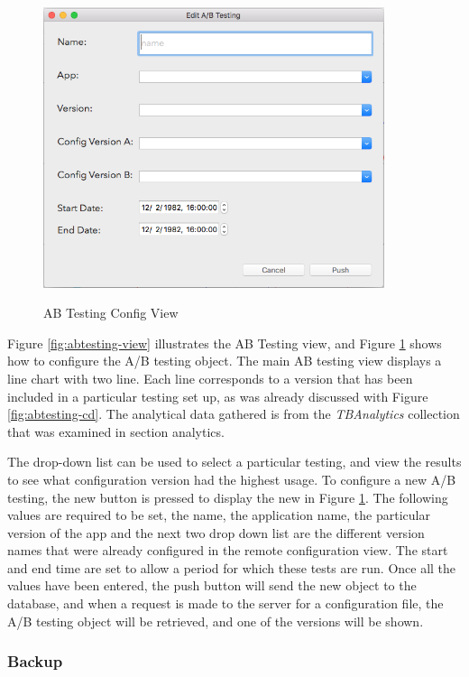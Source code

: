 \begin{figure}[!h]
    \caption{AB Testing Config View}
    \centering
    \includegraphics[width=100mm]{images/dashboard/abtesting-config}
    \label{fig:abtesting-config-view}
\end{figure} 

Figure \ref{fig:abtesting-view} illustrates the AB Testing view, and Figure \ref{fig:abtesting-config-view} shows how to configure the A/B testing object. The main AB testing view displays a line chart with two line. Each line corresponds to a version that has been included in a particular testing set up, as was already discussed with Figure \ref{fig:abtesting-cd}. The analytical data gathered is from the \textit{TBAnalytics} collection that was examined in section analytics.

The drop-down list can be used to select a particular testing, and view the results to see what configuration version had the highest usage. To configure a new A/B testing, the new button is pressed to display the new in Figure \ref{fig:abtesting-config-view}. The following values are required to be set, the name, the application name, the particular version of the app and the next two drop down list are the different version names that were already configured in the remote configuration view. The start and end time are set to allow a period for which these tests are run. Once all the values have been entered, the push button will send the new object to the database, and when a request is made to the server for a configuration file, the A/B testing object will be retrieved, and one of the versions will be shown.

\subsubsection{Backup}

